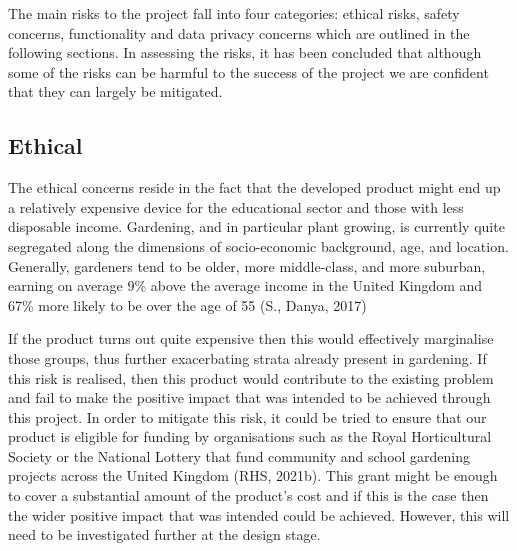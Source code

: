 \documentclass{article}
\begin{document}
The main risks to the project fall into four categories: ethical risks, safety concerns, functionality and data privacy concerns which are outlined in the following sections. In assessing the risks, it has been concluded that although some of the risks can be harmful to the success of the project we are confident that they can largely be mitigated.

\subsection{Ethical}
The ethical concerns reside in the fact that the developed product might end up a relatively expensive device for the educational sector and those with less disposable income. Gardening, and in particular plant growing, is currently quite segregated along the dimensions of socio-economic background, age, and location. Generally, gardeners tend to be older, more middle-class, and more suburban, earning on average 9\% above the average income in the United Kingdom and 67\% more likely to be over the age of 55 (S., Danya, 2017) %

If the product turns out quite expensive then this would effectively marginalise those groups, thus further exacerbating strata already present in gardening. If this risk is realised, then this product would contribute to the existing problem and fail to make the positive impact that was intended to be achieved through this project. In order to mitigate this risk, it could be tried to ensure that our product is eligible for funding by organisations such as the Royal Horticultural Society or the National Lottery that fund community and school gardening projects across the United Kingdom (RHS, 2021b). This grant might be enough to cover a substantial amount of the product’s cost and if this is the case then the wider positive impact that was intended could be achieved. However, this will need to be investigated further at the design stage. 
\end{document}

